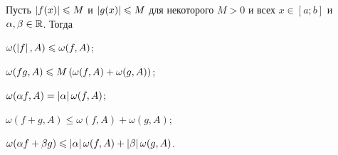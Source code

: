 \begin{proposal}
    Пусть $\left\lvert f(x)\right\rvert \leqslant M$ и $\left\lvert g(x)\right\rvert \leqslant M$ для некоторого $M > 0$ и всех $x \in [a; b]$ и $\alpha, \beta \in \mathbb{R}$. Тогда
    \begin{enumerate}
        \begin{minipage}{.5\textwidth}
            \item $\omega(\left\lvert f\right\rvert, A) \leqslant \omega(f, A)$;
            \item $\omega(fg, A) \leqslant M\left(\omega(f, A) + \omega(g, A)\right)$;
            \item $\omega(\alpha f, A) = \left\lvert\alpha\right\rvert\omega(f, A)$;
        \end{minipage}
        \begin{minipage}[b]{.5\textwidth}
            \item $\omega(f + g, A) \leqslant \omega(f, A) + \omega(g, A)$;
            \item $\omega(\alpha f + \beta g) \leqslant \left\lvert\alpha\right\rvert\omega(f, A) + \left\lvert\beta\right\rvert\omega(g, A)$.
        \end{minipage}
    \end{enumerate}
\end{proposal}

